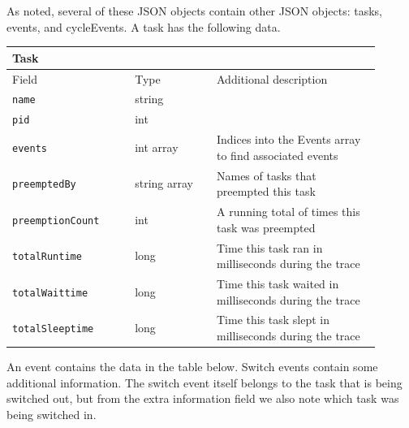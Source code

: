 \documentclass{hmcclinic}
\begin{document}
  As noted, several of these JSON objects contain other JSON objects: tasks,
  events, and cycleEvents. A task has the following data.

  \begin{center}
    \begin{tabular}{p{0.3\linewidth}p{0.2\linewidth}p{0.4\linewidth}}
      \toprule
      Task      &        &                                        \\
      \midrule
      Field           & Type         & Additional description \\
      \midrule
       \texttt{name}            & string       & \\
       \texttt{pid}             & int          & \\
       \texttt{events}          & int array    & Indices into the Events array to find associated events\\
       \texttt{preemptedBy}     & string array & Names of tasks that preempted this task \\
      \texttt{preemptionCount} & int          & A running total of times this task was preempted                    \\
       \texttt{totalRuntime}    & long         & Time this task ran in milliseconds during the trace        \\
       \texttt{totalWaittime}   & long         & Time this task waited in milliseconds during the trace     \\
       \texttt{totalSleeptime}  & long         & Time this task slept in milliseconds during the trace\\
      \bottomrule
    \end{tabular}
  \end{center}

  An event contains the data in the table below. Switch events contain some additional
  information. The switch event itself belongs to the task that is being
  switched out, but from the extra information field we also note which task
  was being switched in.
\end{document}
